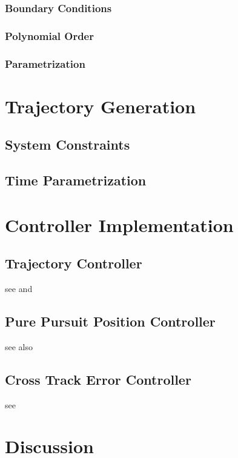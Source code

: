 \subsubsection{Boundary Conditions}
\subsubsection{Polynomial Order}
\subsubsection{Parametrization}

\section{Trajectory Generation}
\subsection{System Constraints}
\subsection{Time Parametrization}

\section{Controller Implementation}
\subsection{Trajectory Controller}
see \cite{snider} and \cite{deluca}
\subsection{Pure Pursuit Position Controller}
see also \cite{snider}
\subsection{Cross Track Error Controller}
see \cite{williams}

\section{Discussion}


